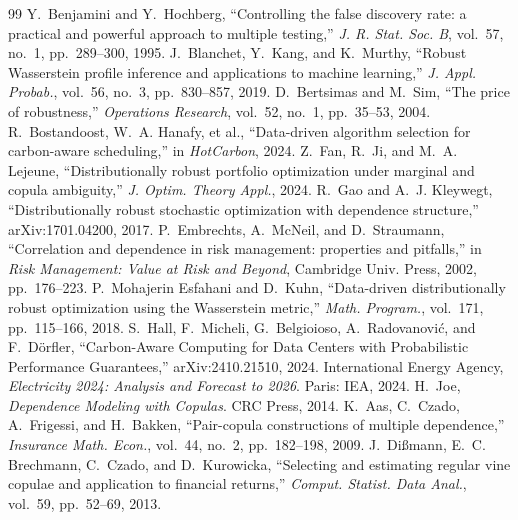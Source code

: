 \documentclass[10pt,twocolumn]{article}
\begin{document}
\renewcommand{\bibsection}{\section*{References}}
\begin{thebibliography}{99}\small
{} Y.~Benjamini and Y.~Hochberg, ``Controlling the false
discovery rate: a practical and powerful approach to multiple testing,'' \emph{J.
R. Stat. Soc. B}, vol.~57, no.~1, pp.~289--300, 1995.
 J.~Blanchet, Y.~Kang, and K.~Murthy, ``Robust Wasserstein
profile inference and applications to machine learning,'' \emph{J. Appl. Probab.},
vol.~56, no.~3, pp.~830--857, 2019.
 D.~Bertsimas and M.~Sim, ``The price of robustness,''
\emph{Operations Research}, vol.~52, no.~1, pp.~35--53, 2004.
 R.~Bostandoost, W.~A. Hanafy, et al., ``Data-driven
algorithm selection for carbon-aware scheduling,'' in \emph{HotCarbon}, 2024.
 Z.~Fan, R.~Ji, and M.~A. Lejeune, ``Distributionally robust
portfolio optimization under marginal and copula ambiguity,'' \emph{J. Optim.
Theory Appl.}, 2024.
 R.~Gao and A.~J. Kleywegt, ``Distributionally robust stochastic
optimization with dependence structure,'' arXiv:1701.04200, 2017.
 P.~Embrechts, A.~McNeil, and D.~Straumann, ``Correlation
and dependence in risk management: properties and pitfalls,'' in \emph{Risk
Management: Value at Risk and Beyond}, Cambridge Univ. Press, 2002, pp.~176--223.
 P.~Mohajerin Esfahani and D.~Kuhn, ``Data-driven
distributionally robust optimization using the Wasserstein metric,'' \emph{Math.
Program.}, vol.~171, pp.~115--166, 2018.
 S.~Hall, F.~Micheli, G.~Belgioioso, A.~Radovanovi\'c, and
F.~D\"orfler, ``Carbon-Aware Computing for Data Centers with Probabilistic
Performance Guarantees,'' arXiv:2410.21510, 2024.
 International Energy Agency, \emph{Electricity 2024: Analysis and
Forecast to 2026}. Paris: IEA, 2024.
 H.~Joe, \emph{Dependence Modeling with Copulas}. CRC Press, 2014.
 K.~Aas, C.~Czado, A.~Frigessi, and H.~Bakken, ``Pair-copula
constructions of multiple dependence,'' \emph{Insurance Math. Econ.}, vol.~44,
no.~2, pp.~182--198, 2009.
 J.~Di\ss mann, E.~C. Brechmann, C.~Czado, and D.~Kurowicka,
``Selecting and estimating regular vine copulae and application to financial
returns,'' \emph{Comput. Statist. Data Anal.}, vol.~59, pp.~52--69, 2013.

\end{thebibliography}
\end{document}
